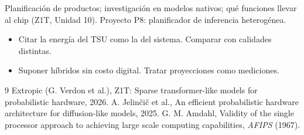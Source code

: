 \documentclass[11pt,a4paper]{article}
\begin{document}
\begin{aplicacion}
Planificación de productos; investigación en modelos nativos; qué funciones llevar al chip (Z1T, Unidad 10). Proyecto P8: planificador de inferencia heterogénea.
\end{aplicacion}

\begin{error}
\begin{itemize}[nosep]
\item Citar la energía del TSU como la del sistema. \quad Comparar con calidades distintas.
\item Suponer híbridos sin costo digital. \quad Tratar proyecciones como mediciones.
\end{itemize}
\end{error}

\begin{thebibliography}{9}\small
{} Extropic (G. Verdon et al.), Z1T: Sparse transformer-like models for probabilistic hardware, 2026.
 A. Jelinčič et al., An efficient probabilistic hardware architecture for diffusion-like models, 2025.
 G. M. Amdahl, Validity of the single processor approach to achieving large scale computing capabilities, \emph{AFIPS} (1967).
\end{thebibliography}
\end{document}
